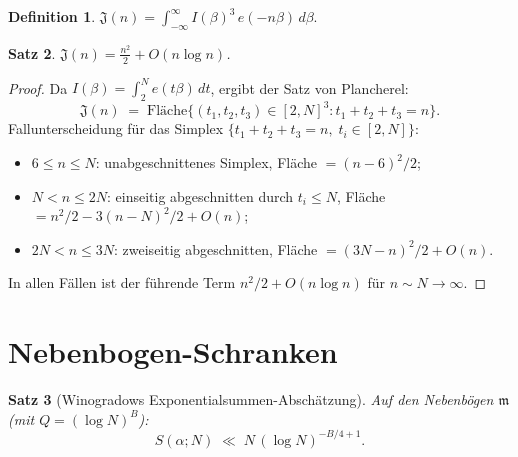 \documentclass[12pt,a4paper]{amsart}
\newtheorem{theorem}{Satz}[section]
\theoremstyle{definition}
\newtheorem{definition}[theorem]{Definition}
\newcommand{\eq}[1]{e\!\left(#1\right)}
\begin{document}
\begin{definition}
  $\mathfrak{J}(n) = \int_{-\infty}^{\infty} I(\beta)^3\, \eq{-n\beta}\, d\beta$.
\end{definition}

\begin{theorem}\label{thm:sing_int}
  $\mathfrak{J}(n) = \frac{n^2}{2} + O(n \log n)$.
\end{theorem}

\begin{proof}
  Da $I(\beta) = \int_2^N \eq{t\beta}\, dt$, ergibt der Satz von Plancherel:
  \[
    \mathfrak{J}(n)
    \;=\; \text{Fläche}\bigl\{(t_1,t_2,t_3) \in [2,N]^3 : t_1+t_2+t_3 = n\bigr\}.
  \]
  Fallunterscheidung für das Simplex $\{t_1+t_2+t_3=n,\; t_i \in [2,N]\}$:
  \begin{itemize}
    \item $6 \leq n \leq N$: unabgeschnittenes Simplex,
      Fläche $= (n-6)^2/2$;
    \item $N < n \leq 2N$: einseitig abgeschnitten durch $t_i \leq N$,
      Fläche $= n^2/2 - 3(n-N)^2/2 + O(n)$;
    \item $2N < n \leq 3N$: zweiseitig abgeschnitten,
      Fläche $= (3N-n)^2/2 + O(n)$.
  \end{itemize}
  In allen Fällen ist der führende Term $n^2/2 + O(n\log n)$ für $n \sim N \to \infty$.
  \qedhere
\end{proof}

\section{Nebenbogen-Schranken}
\label{sec:nebenbogen}

\begin{theorem}[Winogradows Exponentialsummen-Abschätzung]\label{thm:vino_minor}
  Auf den Nebenbögen $\mathfrak{m}$ (mit $Q = (\log N)^B$):
  \[
    S(\alpha;N) \;\ll\; N\, (\log N)^{-B/4+1}.
  \]
\end{theorem}
\end{document}
